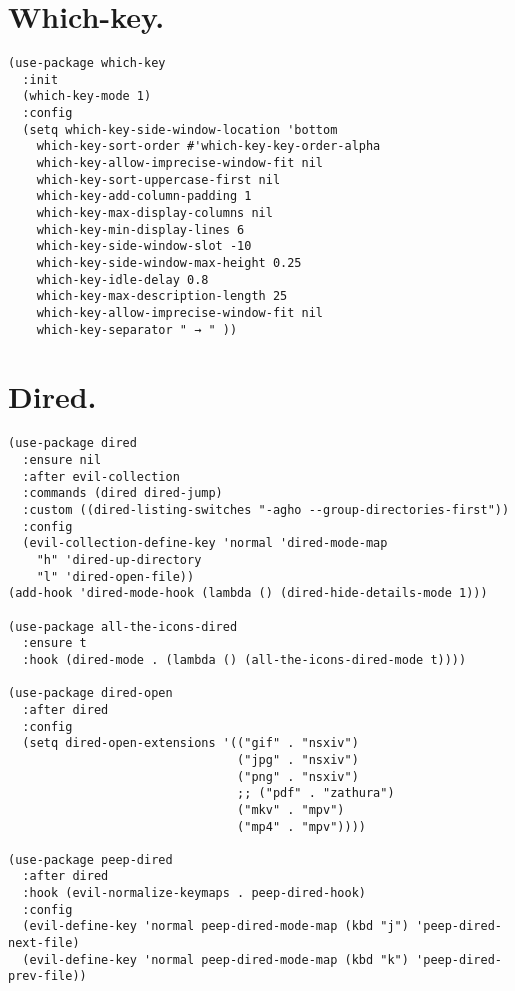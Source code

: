 \documentclass[11pt]{article}
\begin{document}
\section{Which-key.}
\label{sec:orgb85a999}
\begin{verbatim}
(use-package which-key
  :init
  (which-key-mode 1)
  :config
  (setq which-key-side-window-location 'bottom
    which-key-sort-order #'which-key-key-order-alpha
    which-key-allow-imprecise-window-fit nil
    which-key-sort-uppercase-first nil
    which-key-add-column-padding 1
    which-key-max-display-columns nil
    which-key-min-display-lines 6
    which-key-side-window-slot -10
    which-key-side-window-max-height 0.25
    which-key-idle-delay 0.8
    which-key-max-description-length 25
    which-key-allow-imprecise-window-fit nil
    which-key-separator " → " ))
\end{verbatim}
\section{Dired.}
\label{sec:org48c1ff4}
\begin{verbatim}
(use-package dired
  :ensure nil
  :after evil-collection
  :commands (dired dired-jump)
  :custom ((dired-listing-switches "-agho --group-directories-first"))
  :config
  (evil-collection-define-key 'normal 'dired-mode-map
    "h" 'dired-up-directory
    "l" 'dired-open-file))
(add-hook 'dired-mode-hook (lambda () (dired-hide-details-mode 1)))

(use-package all-the-icons-dired
  :ensure t
  :hook (dired-mode . (lambda () (all-the-icons-dired-mode t))))

(use-package dired-open
  :after dired
  :config
  (setq dired-open-extensions '(("gif" . "nsxiv")
                                ("jpg" . "nsxiv")
                                ("png" . "nsxiv")
                                ;; ("pdf" . "zathura")
                                ("mkv" . "mpv")
                                ("mp4" . "mpv"))))

(use-package peep-dired
  :after dired
  :hook (evil-normalize-keymaps . peep-dired-hook)
  :config
  (evil-define-key 'normal peep-dired-mode-map (kbd "j") 'peep-dired-next-file)
  (evil-define-key 'normal peep-dired-mode-map (kbd "k") 'peep-dired-prev-file))

\end{verbatim}
\end{document}

